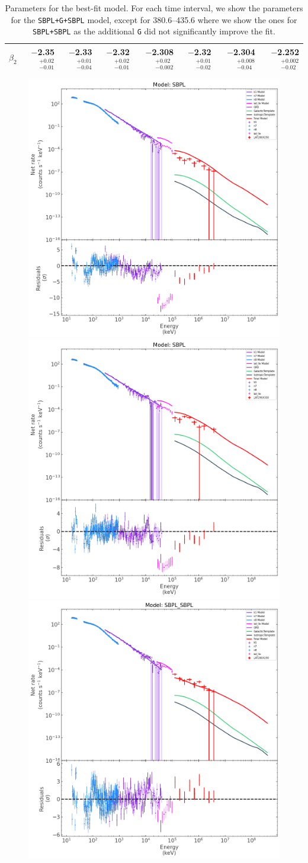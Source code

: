 \documentclass[preprint]{aastex631}
\begin{document}
\begin{table}
\begin{tabular}{c | rrrrrrr}
$\beta_2$ & $-$2.35$^{+0.02}_{-0.01}$ & $-$2.33$^{+0.01}_{-0.04}$ & $-$2.32$^{+0.02}_{-0.01}$ & $-$2.308$^{+0.02}_{-0.002}$ & $-$2.32$^{+0.01}_{-0.02}$ & $-$2.304$^{+0.008}_{-0.04}$ & $-$2.252$^{+0.002}_{-0.02}$ \\
\hline
\end{tabular}
\caption{Parameters for the best-fit model. For each time interval, we show the parameters for the \texttt{SBPL+G+SBPL} model, except for 380.6--435.6 where we show the ones for \texttt{SBPL+SBPL} as the additional \texttt{G} did not significantly improve the fit.}
\label{tab:joint_best}
\end{table}

\begin{figure}[t]
    \centering    
    \includegraphics[width=0.4\linewidth]{spectrum_280p61-290p61_SBPL.png}
    \includegraphics[width=0.4\linewidth]{spectrum_290p61-300p61_SBPL.png}\\
    \includegraphics[width=0.4\linewidth]{spectrum_280p61-290p61_SBPL_SBPL.png}

\end{figure}
\end{document}
